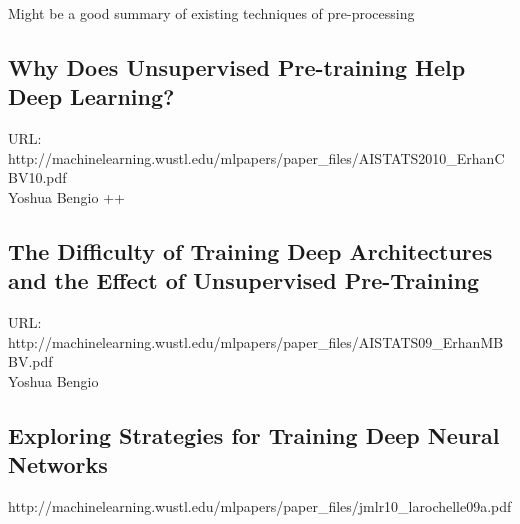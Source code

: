 			Might be a good summary of existing techniques of pre-processing


		\subsection{Why Does Unsupervised Pre-training Help Deep Learning?}
			URL: http://machinelearning.wustl.edu/mlpapers/paper\_files/AISTATS2010\_ErhanCBV10.pdf \\
			Yoshua Bengio ++ \\


		\subsection{The Difficulty of Training Deep Architectures and the Effect of Unsupervised Pre-Training}
			URL: http://machinelearning.wustl.edu/mlpapers/paper\_files/AISTATS09\_ErhanMBBV.pdf \\
			Yoshua Bengio \\


		\subsection{Exploring Strategies for Training Deep Neural Networks}
			http://machinelearning.wustl.edu/mlpapers/paper\_files/jmlr10\_larochelle09a.pdf \\
